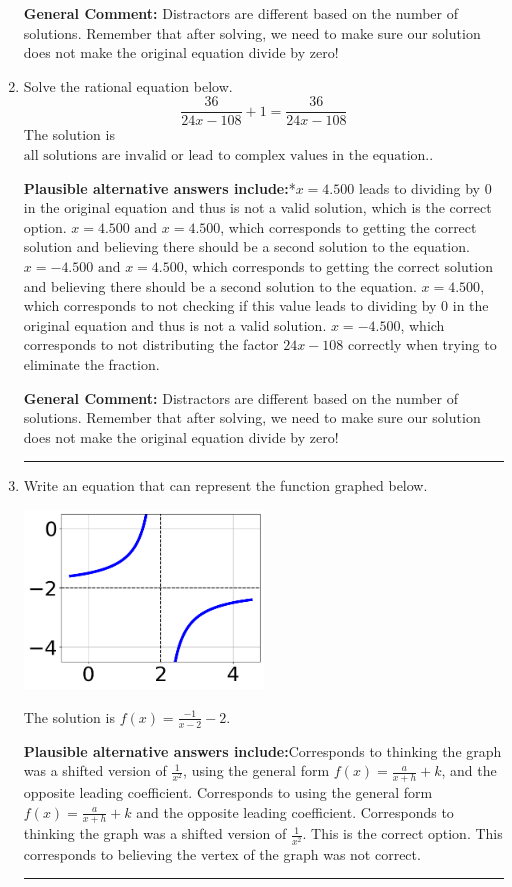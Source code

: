 \documentclass{extbook}[14pt]
\newcommand{\litem}[1]{\item #1

\rule{\textwidth}{0.4pt}}
\begin{document}
\begin{enumerate}
{\textbf{General Comment:} Distractors are different based on the number of solutions. Remember that after solving, we need to make sure our solution does not make the original equation divide by zero!
}
\litem{
Solve the rational equation below.
\[ \frac{36}{24x -108} + 1 = \frac{36}{24x -108} \]The solution is \( \text{all solutions are invalid or lead to complex values in the equation.} \).\begin{enumerate}[label=\Alph*.]
\textbf{Plausible alternative answers include:}*$x = 4.500$ leads to dividing by 0 in the original equation and thus is not a valid solution, which is the correct option.
$x = 4.500 \text{ and } x = 4.500$, which corresponds to getting the correct solution and believing there should be a second solution to the equation.
$x = -4.500 \text{ and } x = 4.500$, which corresponds to getting the correct solution and believing there should be a second solution to the equation.
$x = 4.500$, which corresponds to not checking if this value leads to dividing by 0 in the original equation and thus is not a valid solution.
$x = -4.500$, which corresponds to not distributing the factor $24x -108$ correctly when trying to eliminate the fraction.
\end{enumerate}

\textbf{General Comment:} Distractors are different based on the number of solutions. Remember that after solving, we need to make sure our solution does not make the original equation divide by zero!
}
\litem{
Write an equation that can represent the function graphed below.

\begin{center}
    \includegraphics[width=0.5\textwidth]{../Figures/rationalGraphToEquationA.png}
\end{center}


The solution is \( f(x) = \frac{-1}{x - 2} - 2 \).\begin{enumerate}[label=\Alph*.]
\textbf{Plausible alternative answers include:}Corresponds to thinking the graph was a shifted version of $\frac{1}{x^2}$, using the general form $f(x) = \frac{a}{x+h}+k$, and the opposite leading coefficient.
Corresponds to using the general form $f(x) = \frac{a}{x+h}+k$ and the opposite leading coefficient.
Corresponds to thinking the graph was a shifted version of $\frac{1}{x^2}$.
This is the correct option.
This corresponds to believing the vertex of the graph was not correct.
\end{enumerate}

}
\end{enumerate}
\end{document}
